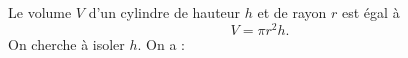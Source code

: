 
Le volume $V$ d'un cylindre de hauteur $h$ et de rayon $r$ est égal à \[ V=\pi r^{2} h. \]
On cherche à isoler $h$. On a :

\smallskip

